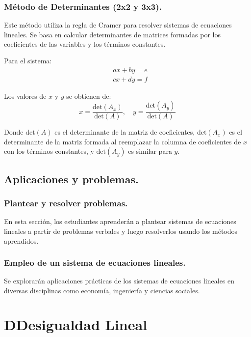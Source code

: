 \subsubsection{Método de Determinantes (2x2 y 3x3).}
Este método utiliza la regla de Cramer para resolver sistemas de ecuaciones lineales. Se basa en calcular determinantes de matrices formadas por los coeficientes de las variables y los términos constantes.

\begin{example}
Para el sistema:
\[
\begin{aligned}
&ax + by = e \\
&cx + dy = f
\end{aligned}
\]

Los valores de \(x\) y \(y\) se obtienen de:
\[
x = \frac{\text{det}(A_x)}{\text{det}(A)}, \quad y = \frac{\text{det}(A_y)}{\text{det}(A)}
\]

Donde \(\text{det}(A)\) es el determinante de la matriz de coeficientes, \(\text{det}(A_x)\) es el determinante de la matriz formada al reemplazar la columna de coeficientes de \(x\) con los términos constantes, y \(\text{det}(A_y)\) es similar para \(y\).
\end{example}

\subsection{Aplicaciones y problemas.}

\subsubsection{Plantear y resolver problemas.}
En esta sección, los estudiantes aprenderán a plantear sistemas de ecuaciones lineales a partir de problemas verbales y luego resolverlos usando los métodos aprendidos.

\subsubsection{Empleo de un sistema de ecuaciones lineales.}
Se explorarán aplicaciones prácticas de los sistemas de ecuaciones lineales en diversas disciplinas como economía, ingeniería y ciencias sociales.





\section{DDesigualdad Lineal} %

